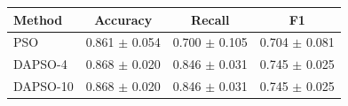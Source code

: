 \begin{tabular}{lccc}
\hline
Method & Accuracy & Recall & F1 \\
\hline
PSO & 0.861 $\pm$ 0.054 & 0.700 $\pm$ 0.105 & 0.704 $\pm$ 0.081 \\
DAPSO-4 & 0.868 $\pm$ 0.020 & 0.846 $\pm$ 0.031 & 0.745 $\pm$ 0.025 \\
DAPSO-10 & 0.868 $\pm$ 0.020 & 0.846 $\pm$ 0.031 & 0.745 $\pm$ 0.025 \\
\hline
\end{tabular}